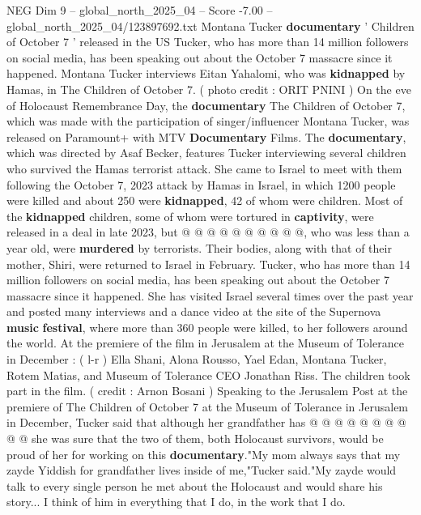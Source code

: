 \begin{textsample}{NEG Dim 9 – global\_north\_2025\_04 – Score -7.00 – global\_north\_2025\_04/123897692.txt}  \label{ex:f9_neg_127}
Montana Tucker \textbf{documentary} ' Children of October 7 ' released in the US Tucker, who has more than 14 million followers on social media, has been speaking out about the October 7 massacre since it happened.
Montana Tucker interviews Eitan Yahalomi, who was \textbf{kidnapped} by Hamas, in The Children of October 7. ( photo credit : ORIT PNINI ) On the eve of Holocaust Remembrance Day, the \textbf{documentary} The Children of October 7, which was made with the participation of singer/influencer Montana Tucker, was released on Paramount+ with MTV \textbf{Documentary} Films.
The \textbf{documentary}, which was directed by Asaf Becker, features Tucker interviewing several children who survived the Hamas terrorist attack.
She came to Israel to meet with them following the October 7, 2023 attack by Hamas in Israel, in which 1200 people were killed and about 250 were \textbf{kidnapped}, 42 of whom were children.
Most of the \textbf{kidnapped} children, some of whom were tortured in \textbf{captivity}, were released in a deal in late 2023, but @ @ @ @ @ @ @ @ @ @, who was less than a year old, were \textbf{murdered} by terrorists.
Their bodies, along with that of their mother, Shiri, were returned to Israel in February.
Tucker, who has more than 14 million followers on social media, has been speaking out about the October 7 massacre since it happened.
She has visited Israel several times over the past year and posted many interviews and a dance video at the site of the Supernova \textbf{music} \textbf{festival}, where more than 360 people were killed, to her followers around the world.
At the premiere of the film in Jerusalem at the Museum of Tolerance in December : ( l-r ) Ella Shani, Alona Rousso, Yael Edan, Montana Tucker, Rotem Matias, and Museum of Tolerance CEO Jonathan Riss.
The children took part in the film. ( credit : Arnon Bosani ) Speaking to the Jerusalem Post at the premiere of The Children of October 7 at the Museum of Tolerance in Jerusalem in December, Tucker said that although her grandfather has @ @ @ @ @ @ @ @ @ @ she was sure that the two of them, both Holocaust survivors, would be proud of her for working on this \textbf{documentary}."My mom always says that my zayde Yiddish for grandfather lives inside of me,"Tucker said."My zayde would talk to every single person he met about the Holocaust and would share his story...
I think of him in everything that I do, in the work that I do.

\end{textsample}
